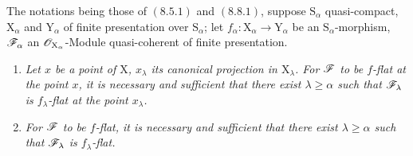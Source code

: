 \begin{theorem}[11.2.6]
\label{IV.11.2.6}
The notations being those of $(8.5.1)$ and $(8.8.1)$, suppose $\mathrm{S}_\alpha$ quasi-compact, $\mathrm{X}_\alpha$ and $\mathrm{Y}_\alpha$ of finite presentation over $\mathrm{S}_\alpha$; let $f_\alpha:\mathrm{X}_\alpha\to\mathrm{Y}_\alpha$ be an $\mathrm{S}_\alpha$-morphism, $\mathscr{F}_\alpha$ an $\mathscr{O}_{\mathrm{X}_\alpha}$-Module quasi-coherent of finite presentation.


\begin{enumerate}[label=\emph{(\roman*)}]
  \item \emph{Let $x$ be a point of $\mathrm{X}$, $x_\lambda$ its canonical projection in $\mathrm{X}_\lambda$. For $\mathscr{F}$ to be $f$-flat at the point $x$, it is necessary and sufficient that there exist $\lambda\geqslant\alpha$ such that $\mathscr{F}_\lambda$ is $f_\lambda$-flat at the point $x_\lambda$.}
  \item \emph{For $\mathscr{F}$ to be $f$-flat, it is necessary and sufficient that there exist $\lambda\geqslant\alpha$ such that $\mathscr{F}_\lambda$ is $f_\lambda$-flat.}
\end{enumerate}
\end{theorem}

